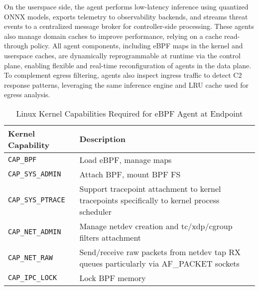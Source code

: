 \documentclass [11pt, proquest] {uwthesis}[2020/02/24]
\begin{document}
On the userspace side, the agent performs low-latency inference using quantized ONNX models, exports telemetry to observability backends, and streams threat events to a centralized message broker for controller-side processing. These agents also manage domain caches to improve performance, relying on a cache read-through policy. All agent components, including eBPF maps in the kernel and userspace caches, are dynamically reprogrammable at runtime via the control plane, enabling flexible and real-time reconfiguration of agents in the data plane. To complement egress filtering, agents also inspect ingress traffic to detect C2 response patterns, leveraging the same inference engine and LRU cache used for egress analysis.
\begin{table}[htbp]
\centering
\begin{tabular}{|l|p{10cm}|}
\hline
\textbf{Kernel Capability} & \textbf{Description} \\
\hline
\texttt{CAP\_BPF} & Load eBPF, manage maps \\
\hline
\texttt{CAP\_SYS\_ADMIN} & Attach BPF, mount BPF FS \\
\hline
\texttt{CAP\_SYS\_PTRACE} & Support tracepoint attachment to kernel tracepoints  specifically to kernel process scheduler \\ 
\hline
\texttt{CAP\_NET\_ADMIN} & Manage netdev creation and tc/xdp/cgroup filters attachment \\
\hline
\texttt{CAP\_NET\_RAW} & Send/receive raw packets from netdev tap RX queues particularly via AF\_PACKET sockets  \\
\hline
\texttt{CAP\_IPC\_LOCK} & Lock BPF memory \\
\hline
\end{tabular}
\caption{Linux Kernel Capabilities Required for eBPF Agent at Endpoint}
\label{sec:dp_kernel_cap}
\end{table}
\end{document}
